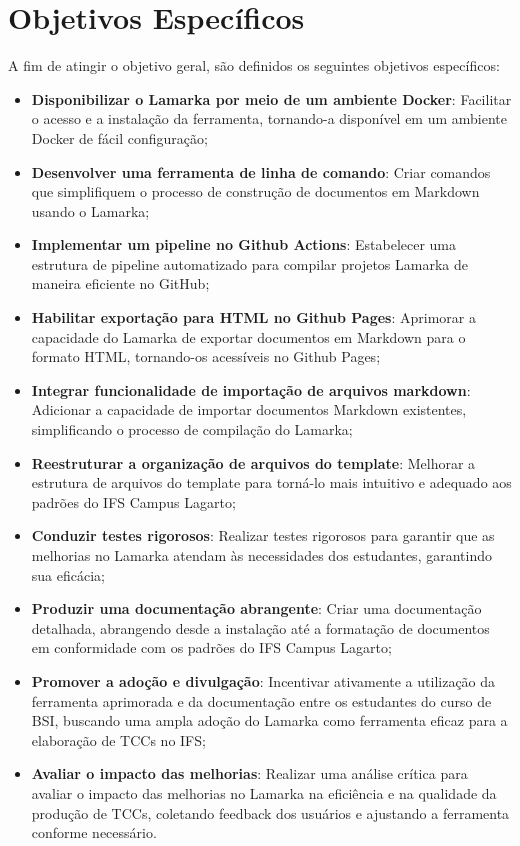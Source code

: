 \documentclass[
	12pt,				%
	oneside,			%
	a4paper,			%
	english,			%
	french,				%
	spanish,			%
	brazil				%
	]{abntex2}
\begin{document}
\hypertarget{objetivos-especuxedficos}{%
\section{Objetivos Específicos}\label{objetivos-especuxedficos}}

A fim de atingir o objetivo geral, são definidos os seguintes objetivos
específicos:

\begin{itemize}
\tightlist
\item
  \textbf{Disponibilizar o Lamarka por meio de um ambiente Docker}:
  Facilitar o acesso e a instalação da ferramenta, tornando-a disponível
  em um ambiente Docker de fácil configuração;
\item
  \textbf{Desenvolver uma ferramenta de linha de comando}: Criar
  comandos que simplifiquem o processo de construção de documentos em
  Markdown usando o Lamarka;
\item
  \textbf{Implementar um pipeline no Github Actions}: Estabelecer uma
  estrutura de pipeline automatizado para compilar projetos Lamarka de
  maneira eficiente no GitHub;
\item
  \textbf{Habilitar exportação para HTML no Github Pages}: Aprimorar a
  capacidade do Lamarka de exportar documentos em Markdown para o
  formato HTML, tornando-os acessíveis no Github Pages;
\item
  \textbf{Integrar funcionalidade de importação de arquivos markdown}:
  Adicionar a capacidade de importar documentos Markdown existentes,
  simplificando o processo de compilação do Lamarka;
\item
  \textbf{Reestruturar a organização de arquivos do template}: Melhorar
  a estrutura de arquivos do template para torná-lo mais intuitivo e
  adequado aos padrões do IFS Campus Lagarto;
\item
  \textbf{Conduzir testes rigorosos}: Realizar testes rigorosos para
  garantir que as melhorias no Lamarka atendam às necessidades dos
  estudantes, garantindo sua eficácia;
\item
  \textbf{Produzir uma documentação abrangente}: Criar uma documentação
  detalhada, abrangendo desde a instalação até a formatação de
  documentos em conformidade com os padrões do IFS Campus Lagarto;
\item
  \textbf{Promover a adoção e divulgação}: Incentivar ativamente a
  utilização da ferramenta aprimorada e da documentação entre os
  estudantes do curso de BSI, buscando uma ampla adoção do Lamarka como
  ferramenta eficaz para a elaboração de TCCs no IFS;
\item
  \textbf{Avaliar o impacto das melhorias}: Realizar uma análise crítica
  para avaliar o impacto das melhorias no Lamarka na eficiência e na
  qualidade da produção de TCCs, coletando feedback dos usuários e
  ajustando a ferramenta conforme necessário.
\end{itemize}
\end{document}
